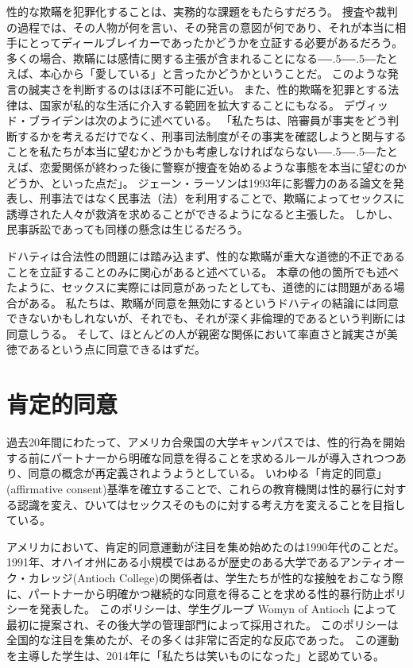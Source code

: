 \documentclass[paper=a4,book,openany]{jlreq}
\def\DDASH{―\kern-.5\zw―\kern-.5\zw―} %
\begin{document}
性的な欺瞞を犯罪化することは、実務的な課題をもたらすだろう。
捜査や裁判の過程では、その人物が何を言い、その発言の意図が何であり、それが本当に相手にとってディールブレイカーであったかどうかを立証する必要があるだろう。
多くの場合、欺瞞には感情に関する主張が含まれることになる{\DDASH}たとえば、本心から「愛している」と言ったかどうかということだ。
このような発言の誠実さを判断するのはほぼ不可能に近い。
また、性的欺瞞を犯罪とする法律は、国家が私的な生活に介入する範囲を拡大することにもなる。
デヴィッド・ブライデンは次のように述べている。
「私たちは、陪審員が事実をどう判断するかを考えるだけでなく、刑事司法制度がその事実を確認しようと関与することを私たちが本当に望むかどうかも考慮しなければならない{\DDASH}たとえば、恋愛関係が終わった後に警察が捜査を始めるような事態を本当に望むのかどうか、といった点だ」\citep[p.469]{bryden00:_redef_rape}。
ジェーン・ラーソンは1993年に影響力のある論文を発表し、刑事法ではなく民事法（法）を利用することで、欺瞞によってセックスに誘導された人々が救済を求めることができるようになると主張した\citep{larson93:_women_under_so_littl_they}。
しかし、民事訴訟であっても同様の懸念は生じるだろう。

ドハティは合法性の問題には踏み込まず、性的な欺瞞が重大な道徳的不正であることを立証することのみに関心があると述べている。
本章の他の箇所でも述べたように、セックスに実際には同意があったとしても、道徳的には問題がある場合がある。
私たちは、欺瞞が同意を無効にするというドハティの結論には同意できないかもしれないが、それでも、それが深く非倫理的であるという判断には同意しうる。
そして、ほとんどの人が親密な関係において率直さと誠実さが美徳であるという点に同意できるはずだ。

\section{肯定的同意}

過去20年間にわたって、アメリカ合衆国の大学キャンパスでは、性的行為を開始する前にパートナーから明確な同意を得ることを求めるルールが導入されつつあり、同意の概念が再定義されようようとしている。
いわゆる「肯定的同意」(affirmative consent)基準を確立することで、これらの教育機関は性的暴行に対する認識を変え、ひいてはセックスそのものに対する考え方を変えることを目指している。

アメリカにおいて、肯定的同意運動が注目を集め始めたのは1990年代のことだ。
1991年、オハイオ州にある小規模ではあるが歴史のある大学であるアンティオーク・カレッジ(Antioch College)の関係者は、学生たちが性的な接触をおこなう際に、パートナーから明確かつ継続的な同意を得ることを求める性的暴行防止ポリシーを発表した。
このポリシーは、学生グループ Womyn of Antioch によって最初に提案され、その後大学の管理部門によって採用された。
このポリシーは全国的な注目を集めたが、その多くは非常に否定的な反応であった。
この運動を主導した学生は、2014年に「私たちは笑いものになった」と認めている\citep{saltman14:_we_start_crusad_affir_consen}。
\end{document}
